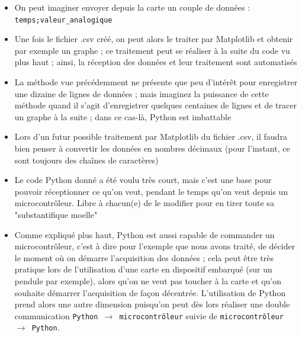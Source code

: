 \documentclass[11pt]{article}
\begin{document}
 \begin{itemize}
 \item On peut imaginer envoyer depuis la carte un couple de données : \texttt{temps;valeur\_analogique}
 \item Une fois le fichier .csv créé, on peut alors le traiter par Matplotlib et obtenir par exemple un graphe ; ce traitement peut se réaliser à la suite du code vu plus haut ; ainsi, la réception des données et leur traitement sont automatisés 
  \item La méthode vue précédemment ne présente que peu d'intérêt pour enregistrer une dizaine de lignes de données ; mais imaginez la puissance de cette méthode quand il s'agit d'enregistrer quelques centaines de lignes et de tracer un graphe à la suite ; dans ce cas-là, Python est imbattable
  \item Lors d'un futur possible traitement par Matplotlib du fichier .csv, il faudra bien penser à convertir les données en nombres décimaux (pour l'instant, ce sont toujours des chaînes de caractères)
  \item Le code Python donné a été voulu très court, mais c'est une base pour pouvoir réceptionner ce qu'on veut, pendant le temps qu'on veut depuis un microcontrôleur. Libre à chacun(e) de le modifier pour en tirer toute sa "substantifique moelle"
  \item Comme expliqué plus haut, Python est aussi capable de commander un microcontrôleur, c'est à dire pour l'exemple que nous avons traité, de décider le moment où on démarre l'acquisition des données ; cela peut être très pratique lors de l'utilisation d'une carte en dispositif embarqué (sur un pendule par exemple), alors qu'on ne veut pas toucher à la carte et qu'on souhaite démarrer l'acquisition de façon décentrée. L'utilisation de Python prend alors une autre dimension puisqu'on peut dès lors réaliser une double communication \texttt{Python $\rightarrow$ microcontrôleur} suivie de \texttt{microcontrôleur $\rightarrow$ Python}.
 \end{itemize}

 
 
 
 
 
 
\end{document}
